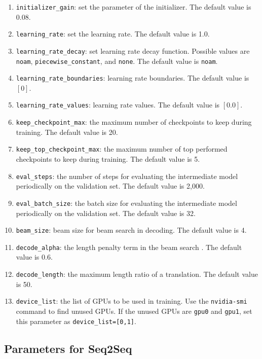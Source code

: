 \documentclass{article}
\begin{document}
\begin{enumerate}
\item \verb|initializer_gain|: set the parameter of the initializer. The default value is 0.08.
\item \verb|learning_rate|: set the learning rate. The default value is 1.0.
\item \verb|learning_rate_decay|: set learning rate decay function. Possible values are \verb|noam|, \verb|piecewise_constant|, and \verb|none|. The default value is \verb|noam|.
\item \verb|learning_rate_boundaries|: learning rate boundaries. The default value is $[0]$.
\item \verb|learning_rate_values|: learning rate values. The default value is $[0.0]$.
\item \verb|keep_checkpoint_max|: the maximum number of checkpoints to keep during training. The default value is 20.
\item \verb|keep_top_checkpoint_max|: the maximum number of top performed checkpoints to keep during training. The default value is 5.
\item \verb|eval_steps|: the number of steps for evaluating the intermediate model periodically on the validation set. The default value is 2,000.
\item \verb|eval_batch_size|: the batch size for evaluating the intermediate model periodically on the validation set. The default value is 32.
\item \verb|beam_size|: beam size for beam search in decoding. The default value is 4.
\item \verb|decode_alpha|: the length penalty term in the beam search \citep{Wu:16}. The default value is 0.6.
\item \verb|decode_length|: the maximum length ratio of a translation. The default value is 50.
\item \verb|device_list|: the list of GPUs to be used in training. Use the \verb|nvidia-smi| command to find unused GPUs. If the unused GPUs are \verb|gpu0| and \verb|gpu1|, set this parameter as \verb|device_list=[0,1]|.
\end{enumerate}

\subsection{Parameters for Seq2Seq}
\end{document}
